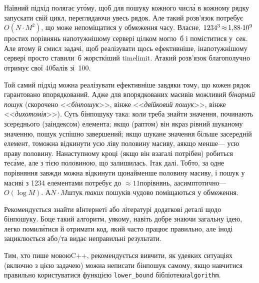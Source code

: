 \documentclass[14pt,a4paper]{extarticle}
\def\dib#1{\,#1\discretionary{}{\mbox{$#1$}}{}\,}
\begin{document}
Наївний підхід полягає у\nolinebreak[3] т\'{о}му, щоб для пошуку кожного числ\'{а} в кожному рядку запускати свій цикл, переглядаючи увесь рядок. Але такий розв'язок потребує $O(N{\cdot}M^2)$, що може не\nolinebreak[3] поміщатися у обмеження часу. Власне, $1234^3\dib{{\approx}}{1{,}88{\cdot}10^9}$ простих порівнянь на\nolinebreak[2] потужнішому сервері цілком могло~б і поміститися у~сек. Але в\nolinebreak[3] тому й смисл задачі, щоб реалізувати щось ефективніше, і\nolinebreak[3] на\nolinebreak[3] потужнішому сервері просто ставили~б жорсткіший time\nolinebreak[2] limit. А\nolinebreak[3] такий розв'язок благополучно отримує свої 40\nolinebreak[3] балів зі~100. 

Той самий підхід можна реалізувати ефективніше завдяки тому, що кожен рядок гарантовано впорядкований. Адже для впорядкованих масивів можливий \emph{бінарний пошук} (скорочено <<\emph{бінпошук}>>, він\nolinebreak[3] же <<\emph{двійковий пошук}>>, він\nolinebreak[3] же <<\emph{дихотомія}>>). Суть бінпошуку така: коли треба знайти значення, починають з\nolinebreak[3] середнього (за\nolinebreak[3] індексом) елемента; якщо (раптом) він якраз рівний шуканому значенню, пошук успішно завершений; якщо шукане значення більше за\nolinebreak[3] середній елемент, то\nolinebreak[3] можна відкинути усю ліву половину масиву, а\nolinebreak[3] якщо менше\nolinebreak[3] --- усю праву половину. На\nolinebreak[3] наступному кроці (якщо він взагалі потрібен) робиться те\nolinebreak[3] с\'{а}ме, але з тією половиною, що залишилась. І\nolinebreak[3] так далі. Тобто, за одне порівняння завжди можна відкинути щонайменше половину масиву, і пошук у масиві з 1234 елементами потребує до ${\approx}11$\nolinebreak[3] порівнянь, а\nolinebreak[3] асимптотично\nolinebreak[3] --- $O(\log{}M)$. А\nolinebreak[3] $N{\cdot}M$\nolinebreak[2] штук \emph{таких} пошуків чудово поміщаються у обмеження. 

Рекомендується знайти в\nolinebreak[3] Інтернеті або літературі додаткові деталі щодо бін\-пошуку. Бо\nolinebreak[3] це такий алгоритм, у\nolinebreak[3] якому, навіть добре знаючи загальну ідею, легко помил\'{и}тися й отримати код, який часто працює правильно, але іноді зациклюється або/та видає неправильні результати. 

Тим, хто пише мовою\nolinebreak[3] C++, рекомендується вивчити, як у\nolinebreak[3] деяких ситуаціях (включно з цією задачею) можна не\nolinebreak[3] писати бін\-пошук самому, якщо навчитися правильно користуватися функцією \verb"lower_bound" бібліотеки\nolinebreak[2] \texttt{algorithm}.
\end{document}
